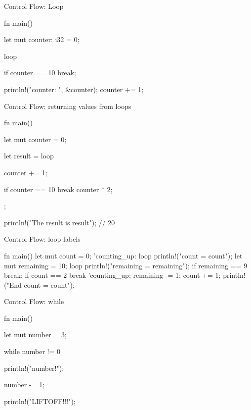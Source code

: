 \begin{frame}[fragile]{Control Flow: Loop}
    \begin{code}
        fn main() {
            let mut counter: i32 = 0;

            loop {
                if counter == 10 {
                    break;
                }

                println!("counter: {}", &counter);
                counter += 1;
            }
        }
    \end{code}
\end{frame}

\begin{frame}[fragile]{Control Flow: returning values from loops}
    \begin{code}
        fn main() {
            let mut counter = 0;

            let result = loop {
                counter += 1;

                if counter == 10 {
                    break counter * 2;
                }
            };

            println!("The result is {result}"); // 20
        }
    \end{code}
\end{frame}

\begin{frame}[fragile]{Control Flow: loop labels}
    \begin{code}[basicstyle=\footnotesize]
        fn main() {
            let mut count = 0;
            'counting_up: loop {
                println!("count = {count}");
                let mut remaining = 10;
                loop {
                    println!("remaining = {remaining}");
                    if remaining == 9 {
                        break;
                    }
                    if count == 2 {
                        break 'counting_up;
                    }
                    remaining -= 1;
                }
                count += 1;
            }
            println!("End count = {count}");
        }
    \end{code}
\end{frame}

\begin{frame}[fragile]{Control Flow: while}
    \begin{code}
        fn main() {
            let mut number = 3;

            while number != 0 {
                println!("{number}!");

                number -= 1;
            }

            println!("LIFTOFF!!!");
        }
    \end{code}
\end{frame}

